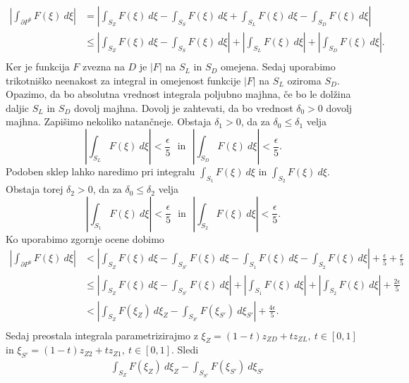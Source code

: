 \documentclass[mat1, tisk]{fmfdelo}
\begin{document}
\begin{dokaz}
        \begin{align*}
            \left|\int_{\partial P^0}{F(\xi)~d\xi}\right| &= \left|\int_{S_Z}{F(\xi)~d\xi} - \int_{S_S}{F(\xi)~d\xi} + \int_{S_L}{F(\xi)~d\xi} - \int_{S_D}{F(\xi)~d\xi}\right|\\
            & \leq \left|\int_{S_Z}{F(\xi)~d\xi} - \int_{S_S}{F(\xi)~d\xi} \right| + \left|\int_{S_L}{F(\xi)~d\xi}\right| + \left|\int_{S_D}{F(\xi)~d\xi}\right|.\\
        \end{align*}
        Ker je funkcija $F$ zvezna na $D$ je $|F|$ na $S_L$ in $S_D$ omejena. 
        Sedaj uporabimo trikotniško neenakost za integral in omejenost funkcije $|F|$ na $S_L$ oziroma $S_D$. 
        Opazimo, da bo absolutna vrednost integrala poljubno majhna, če bo le dolžina daljic $S_L$ in $S_D$ dovolj majhna. 
        Dovolj je zahtevati, da bo vrednost $\delta_0 > 0$ dovolj majhna. 
        Zapišimo nekoliko natančneje. Obstaja $\delta_1 > 0$, da za $\delta_0 \leq \delta_1$ velja
        $$ 
        \left|\int_{S_L}{F(\xi)~d\xi}\right| < \frac{\epsilon}{5}~~~\text{in}~~~\left|\int_{S_D}{F(\xi)~d\xi}\right| < \frac{\epsilon}{5}.
        $$
        Podoben sklep lahko naredimo pri integralu $\int_{S_1}{F(\xi)~d\xi}$ in $\int_{S_2}{F(\xi)~d\xi}$. Obstaja torej $\delta_2 > 0$, da za $\delta_0 \leq \delta_2$ velja
        $$ 
        \left|\int_{S_1}{F(\xi)~d\xi}\right| < \frac{\epsilon}{5}~~~\text{in}~~~\left|\int_{S_2}{F(\xi)~d\xi}\right| < \frac{\epsilon}{5}.
        $$
        Ko uporabimo zgornje ocene dobimo
        \begin{align*}
            \left|\int_{\partial P^0}{F(\xi)~d\xi}\right|&< \left|\int_{S_Z}{F(\xi)~d\xi} - \int_{S_{S'}}{F(\xi)~d\xi} - \int_{S_1}{F(\xi)~d\xi} - \int_{S_2}{F(\xi)~d\xi}\right| + \frac{\epsilon}{5} +  \frac{\epsilon}{5}\\
            & \leq \left|\int_{S_Z}{F(\xi)~d\xi} - \int_{S_{S'}}{F(\xi)~d\xi}\right| + \left|\int_{S_1}{F(\xi)~d\xi}\right| + \left|\int_{S_2}{F(\xi)~d\xi}\right| + \frac{2\epsilon}{5}\\
            & < \left|\int_{S_Z}{F(\xi_Z)~d\xi_Z} - \int_{S_{S'}}{F(\xi_{S'})~d\xi_{S'}}\right| + \frac{4\epsilon}{5}.\\
        \end{align*}
        Sedaj preostala integrala parametrizirajmo z $\xi_Z = (1 -t)z_{ZD} + t z_{ZL},~t \in [0,1]$ in $\xi_{S'} = (1 -t)z_{Z2} + t z_{Z1},~t \in [0,1]$.
        Sledi
        \begin{align*}
            &\int_{S_Z}{F(\xi_Z)~d\xi_Z} - \int_{S_{S'}}{F(\xi_{S'})~d\xi_{S'}}\\

\end{align*}
\end{dokaz}
\end{document}
